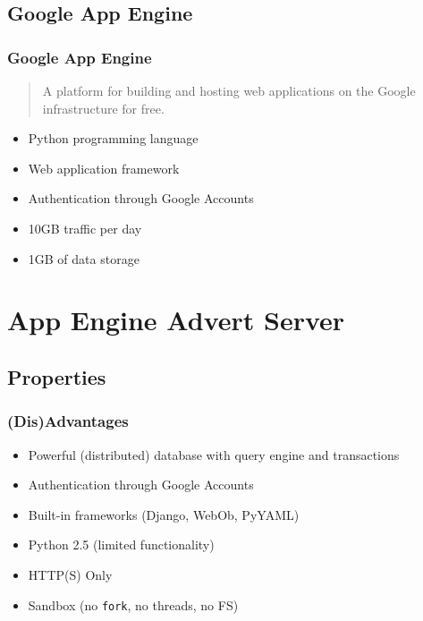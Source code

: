 \documentclass{beamer}
\begin{document}
\subsection{Google App Engine}
\frame
{
	\frametitle{Google App Engine}
	\begin{quote}
		A platform for building and hosting web applications on
		the Google infrastructure for free.
	\end{quote}
	
	\begin{itemize}
		\item Python programming language
		\item Web application framework
		\item Authentication through Google Accounts
		\item 10GB traffic per day
		\item 1GB of data storage
	\end{itemize}
}

\section{App Engine Advert Server}
\subsection{Properties}
\frame
{
	\frametitle{(Dis)Advantages}
	\begin{itemize}
		\item <1->Powerful (distributed) database with query engine and
			transactions
		\item <1->Authentication through Google Accounts
		\item <1->Built-in frameworks (Django, WebOb, PyYAML)
	\end{itemize}

	\begin{itemize}
		\item <2->Python 2.5 (limited functionality)
		\item <2->HTTP(S) Only
		\item <2->Sandbox (no \texttt{fork}, no threads, no FS)
	\end{itemize}
}
\end{document}
